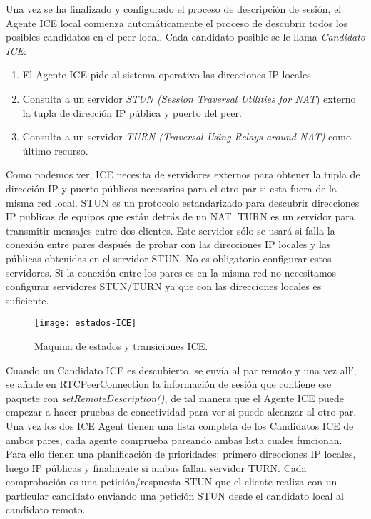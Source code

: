Una vez se ha finalizado y configurado el proceso de descripción de sesión, el Agente ICE local comienza automáticamente el proceso de descubrir todos los posibles candidatos en el peer local. Cada candidato posible se le llama \textit{Candidato ICE}:

\begin{enumerate}
\item El Agente ICE pide al sistema operativo las direcciones IP locales.
\item Consulta a un servidor \emph{STUN (Session Traversal Utilities for NAT}) externo la tupla de dirección IP pública y puerto del peer.
\item Consulta a un servidor \emph{TURN (Traversal Using Relays around NAT)} como último recurso. 
\end{enumerate}

Como podemos ver, ICE necesita de servidores externos para obtener la tupla de dirección IP y puerto públicos necesarios para el otro par si esta fuera de la misma red local. STUN  es un protocolo estandarizado para descubrir direcciones IP publicas de equipos que están detrás de un NAT. TURN es un servidor para transmitir mensajes entre dos clientes. Este servidor sólo se usará si falla la conexión entre pares después de probar con las direcciones IP locales y las públicas obtenidas en el servidor STUN. No es obligatorio configurar estos servidores. Si la conexión entre los pares es en la misma red no necesitamos configurar servidores STUN/TURN ya que con las direcciones locales es suficiente.\\

\begin{figure}[htb]
\centering
\texttt{[image: estados-ICE]}
\caption{Maquina de estados y transiciones ICE.}
\label{fig:estados-ice}
\end{figure}

 
Cuando un Candidato ICE es descubierto, se envía al par remoto y una vez allí, se añade en RTCPeerConnection la información de sesión que contiene ese paquete con \textit{setRemoteDescription()}, de tal manera que el Agente ICE puede empezar a hacer pruebas de conectividad para ver si puede alcanzar al otro par.\\

Una vez los dos ICE Agent tienen una lista completa de los Candidatos ICE de ambos pares, cada agente comprueba pareando ambas lista cuales funcionan. Para ello tienen una planificación de prioridades: primero direcciones IP locales, luego IP públicas y finalmente si ambas fallan servidor TURN. Cada comprobación es una petición/respuesta STUN que el cliente realiza con un particular candidato enviando una petición STUN desde el candidato local al candidato remoto.\\

